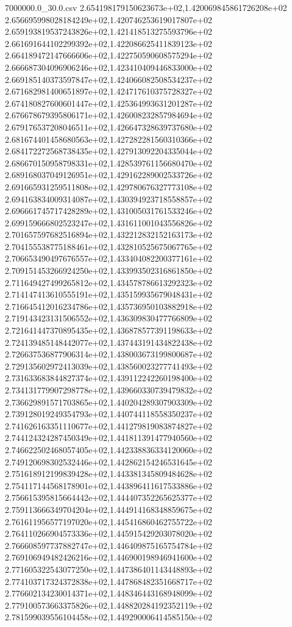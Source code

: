 \begin{filecontents*}{7000000.0_30.0.csv}
2.654198179150623673e+02,1.420069845861726208e+02
2.656695998028184249e+02,1.420746253619017807e+02
2.659193819537243826e+02,1.421418513275593796e+02
2.661691644102299392e+02,1.422086625411839123e+02
2.664189472147666606e+02,1.422750590608575294e+02
2.666687304096906246e+02,1.423410409446833000e+02
2.669185140373597847e+02,1.424066082508534237e+02
2.671682981400651897e+02,1.424717610375728327e+02
2.674180827600601447e+02,1.425364993631201287e+02
2.676678679395806171e+02,1.426008232857984694e+02
2.679176537208046511e+02,1.426647328639737680e+02
2.681674401458680563e+02,1.427282281560310366e+02
2.684172272568738435e+02,1.427913092204335044e+02
2.686670150958798331e+02,1.428539761156680470e+02
2.689168037049126951e+02,1.429162289002533726e+02
2.691665931259511808e+02,1.429780676327773108e+02
2.694163834009314087e+02,1.430394923718558857e+02
2.696661745717428289e+02,1.431005031761533246e+02
2.699159666802523247e+02,1.431611001043556826e+02
2.701657597682516894e+02,1.432212832152163173e+02
2.704155538775188461e+02,1.432810525675067765e+02
2.706653490497676557e+02,1.433404082200377161e+02
2.709151453266924250e+02,1.433993502316861850e+02
2.711649427499265812e+02,1.434578786613292323e+02
2.714147413610555191e+02,1.435159935679048431e+02
2.716645412016234786e+02,1.435736950103882918e+02
2.719143423131506552e+02,1.436309830477766809e+02
2.721641447370895435e+02,1.436878577391198633e+02
2.724139485148442077e+02,1.437443191434822438e+02
2.726637536877906314e+02,1.438003673199800687e+02
2.729135602972413039e+02,1.438560023277741493e+02
2.731633683844827374e+02,1.439112242260198400e+02
2.734131779907298778e+02,1.439660330739479832e+02
2.736629891571703865e+02,1.440204289307903309e+02
2.739128019249354793e+02,1.440744118558350237e+02
2.741626163351110677e+02,1.441279819083874827e+02
2.744124324287450349e+02,1.441811391477940560e+02
2.746622502468057405e+02,1.442338836334120060e+02
2.749120698302532446e+02,1.442862154246531645e+02
2.751618912199839428e+02,1.443381345809484628e+02
2.754117144568178901e+02,1.443896411617533886e+02
2.756615395815664442e+02,1.444407352265625377e+02
2.759113666349704204e+02,1.444914168348859675e+02
2.761611956577197020e+02,1.445416860462755722e+02
2.764110266904573336e+02,1.445915429203078020e+02
2.766608597737882747e+02,1.446409875165754784e+02
2.769106949482426216e+02,1.446900198946941600e+02
2.771605322543077250e+02,1.447386401143448893e+02
2.774103717324372838e+02,1.447868482351668717e+02
2.776602134230014371e+02,1.448346443168948099e+02
2.779100573663375826e+02,1.448820284192352119e+02
2.781599039556104458e+02,1.449290006414585150e+02

\end{filecontents*}
